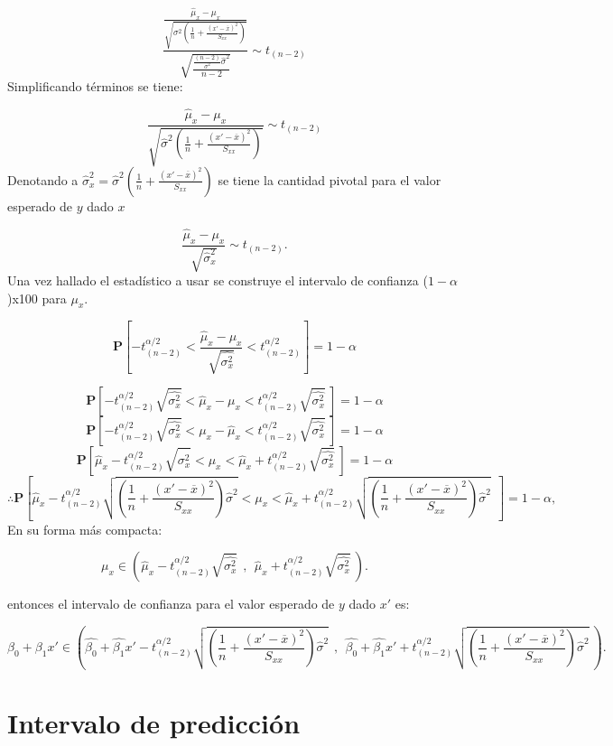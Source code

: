\documentclass[
  a4paper,
  oneside,
  openany]{book}
\begin{document}
\[\frac{\frac{\hat{\mu}_{x}-\mu_{x}}{\sqrt{\sigma^2\left( \frac{1}{n}+\frac{(x'-\overline{x})^2}{S_{xx}}\right)}}}{\sqrt{\frac{\frac{(n-2)}{\sigma^2}\hat{\sigma}^2}{n-2}}}\sim t_{(n-2)}\]
Simplificando términos se tiene:

\[\frac{\hat{\mu}_{x}-\mu_{x}}{\sqrt{\hat{\sigma}^2\left( \frac{1}{n}+\frac{(x'-\overline{x})^2}{S_{xx}}\right)}}\sim t_{(n-2)}\]
Denotando a \(\hat{\sigma}_{x}^2=\hat{\sigma}^2\left(\frac{1}{n}+\frac{(x'-\overline{x})^2}{S_{xx}}\right)\) se tiene la cantidad pivotal para el valor esperado de \(y\) dado \(x\)

\[\frac{\hat{\mu}_{x}-\mu_{x}}{\sqrt{\hat{\sigma}_{x}^2}}\sim t_{(n-2)}.\]
Una vez hallado el estadístico a usar se construye el intervalo de confianza (\(1-\alpha\))x100 para \(\mu_{x}\).

\[\mathbf{P}\left[-t_{(n-2)}^{\alpha/2} < \frac{\hat{\mu}_{x}-\mu_{x}}{\sqrt{\hat{\sigma_{x}^2}}} < t_{(n-2)}^{\alpha/2}\right]=1-\alpha\]

\[\mathbf{P}\left[-t_{(n-2)}^{\alpha/2}\sqrt{\hat{\sigma_{x}^2}}<\hat{\mu}_{x}-\mu_{x}<t_{(n-2)}^{\alpha/2}\sqrt{\hat{\sigma_{x}^2}} \ \right]=1-\alpha\]
\[\mathbf{P}\left[-t_{(n-2)}^{\alpha/2}\sqrt{\hat{\sigma_{x}^2}}<\mu_{x}-\hat{\mu}_{x}<t_{(n-2)}^{\alpha/2}\sqrt{\hat{\sigma_{x}^2}} \ \right]=1-\alpha\]
\[\mathbf{P}\left[\hat{\mu}_{x}-t_{(n-2)}^{\alpha/2}\sqrt{\hat{\sigma_{x}^2}}<\mu_{x}<\hat{\mu}_{x}+t_{(n-2)}^{\alpha/2}\sqrt{\hat{\sigma_{x}^2}} \ \right]=1-\alpha\]
\[\therefore \mathbf{P}\left[\hat{\mu}_{x}-t_{(n-2)}^{\alpha/2}\sqrt{\left( \frac{1}{n}+\frac{(x'-\overline{x})^2}{S_{xx}}\right)\hat{\sigma}^2}<\mu_{x}<\hat{\mu}_{x}+t_{(n-2)}^{\alpha/2}\sqrt{\left( \frac{1}{n}+\frac{(x'-\overline{x})^2}{S_{xx}}\right)\hat{\sigma}^2} \ \ \right]=1-\alpha,\]
En su forma más compacta:

\[\mu_{x} \in \left(\hat{\mu}_{x}-t_{(n-2)}^{\alpha/2}\sqrt{\hat{\sigma_{x}^2}} \ \ , \ \ \hat{\mu}_{x}+t_{(n-2)}^{\alpha/2}\sqrt{\hat{\sigma_{x}^2}} \ \right).\]

entonces el intervalo de confianza para el valor esperado de \(y\) dado \(x'\) es:

\[\beta_{0}+\beta_{1}x' \in \left(\hat{\beta_{0}}+\hat{\beta_{1}}x'-t_{(n-2)}^{\alpha/2}\sqrt{\left( \frac{1}{n}+\frac{(x'-\overline{x})^2}{S_{xx}}\right)\hat{\sigma}^2} \ \ , \ \ \hat{\beta_{0}}+\hat{\beta_{1}}x'+t_{(n-2)}^{\alpha/2}\sqrt{\left( \frac{1}{n}+\frac{(x'-\overline{x})^2}{S_{xx}}\right)\hat{\sigma}^2} \ \right).\]

\hypertarget{intervalo-de-predicciuxf3n}{%
\section{Intervalo de predicción}\label{intervalo-de-predicciuxf3n}}
\end{document}
